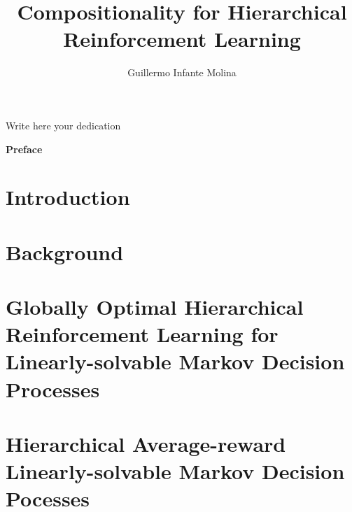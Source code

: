\documentclass[12pt, a4paper,twoside]{tesi_upf}
\title{Compositionality for Hierarchical Reinforcement Learning}
\subtitle{}
\author{Guillermo Infante Molina}
\begin{document}
\frontmatter

\maketitle

\cleardoublepage



\noindent Write here your dedication

\cleardoublepage




\cleardoublepage


% 

\cleardoublepage

{\bf Preface}

\cleardoublepage


\tableofcontents

\listoffigures

\listoftables

\setlength{\parskip}{0.5\baselineskip}
\setlength{\parindent}{0pt}

\mainmatter

\chapter{Introduction}


\chapter{Background}


\chapter{Globally Optimal Hierarchical Reinforcement Learning for Linearly-solvable Markov Decision Processes}

\chapter{Hierarchical Average-reward Linearly-solvable Markov Decision Pocesses}

\end{document}
